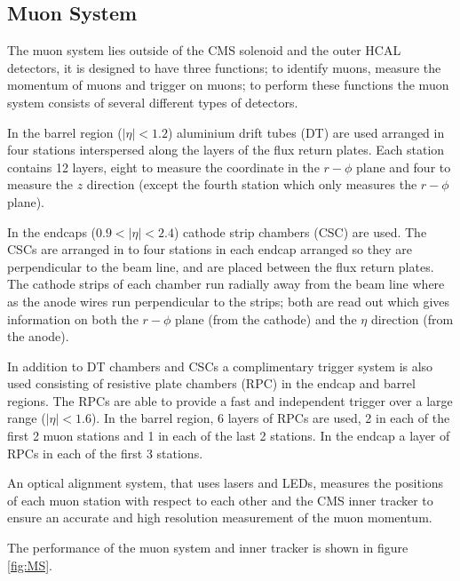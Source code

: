 \subsection{Muon System}
The muon system lies outside of the CMS solenoid and the outer HCAL detectors,
it is designed to have three functions; to identify muons, measure the momentum
of muons and trigger on muons; to perform these functions the muon system
consists of several different types of detectors. \cite{cms}

In the barrel region ($|\eta| < 1.2$) aluminium drift tubes (DT) are used
arranged in four stations interspersed along the layers of the flux return
plates. 
Each station contains 12 layers, eight to measure the coordinate in the
$r-\phi$ plane and four to measure the $z$ direction (except the fourth station
which only measures the $r-\phi$ plane). 

In the endcaps ($0.9<|\eta|<2.4$) cathode strip chambers (CSC) are used. The
CSCs are arranged in to four stations in each endcap arranged so they are
perpendicular to the beam line, and are placed between the flux return plates.
The cathode strips of each chamber run radially away from the beam line where
as the anode wires run perpendicular to the strips; both are read out which
gives information on both the $r-\phi$ plane (from the cathode) and the $\eta$
direction (from the anode). \cite{cms}

In addition to DT chambers and CSCs a complimentary trigger system is also used
consisting of resistive plate chambers (RPC) in the endcap and barrel regions.
The RPCs are able to provide a fast and independent trigger over a large range
($|\eta| < 1.6$). In the barrel region, 6 layers of RPCs are used, 2 in each of
the first 2 muon stations and 1 in each of the last 2 stations. In the endcap a
layer of RPCs in each of the first 3 stations.

An optical alignment system, that uses lasers and LEDs, measures the positions
of each muon station with respect to each other and the CMS inner tracker to
ensure an accurate and high resolution measurement of the muon
momentum.\cite{cms}

The performance of the muon system and inner tracker is shown in figure
\ref{fig:MS}.

